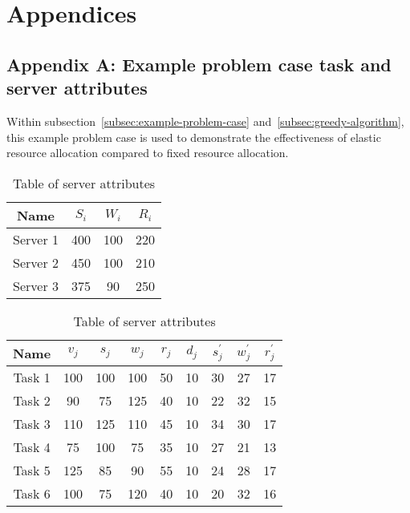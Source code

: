 \section*{Appendices}

\subsection*{Appendix A: Example problem case task and server attributes}
\label{app:example-problem-attributes}
Within subsection~\ref{subsec:example-problem-case} and~\ref{subsec:greedy-algorithm}, this example problem case is used
to demonstrate the effectiveness of elastic resource allocation compared to fixed resource allocation.
\begin{table}[h]
    \begin{minipage}{1.8in}
        \begin{tabular}{|c|c|c|c|}
            \hline
            Name     & $S_i$ & $W_i$ & $R_i$ \\ \hline
            Server 1 & 400   & 100   & 220   \\ \hline
            Server 2 & 450   & 100   & 210   \\ \hline
            Server 3 & 375   & 90    & 250   \\ \hline
        \end{tabular}
        \caption{Table of server attributes}
    \end{minipage}
    \begin{minipage}{3.5in}
        \begin{tabular}{|c|c|c|c|c|c|c|c|c|}
            \hline
            Name    & $v_j$ & $s_j$ & $w_j$ & $r_j$ & $d_j$ & $s^{'}_j$ & $w^{'}_j$ & $r^{'}_j$ \\ \hline
            Task 1  & 100   & 100   & 100   & 50    & 10    & 30        & 27        & 17        \\ \hline
            Task 2  & 90    & 75    & 125   & 40    & 10    & 22        & 32        & 15        \\ \hline
            Task 3  & 110   & 125   & 110   & 45    & 10    & 34        & 30        & 17        \\ \hline
            Task 4  & 75    & 100   & 75    & 35    & 10    & 27        & 21        & 13        \\ \hline
            Task 5  & 125   & 85    & 90    & 55    & 10    & 24        & 28        & 17        \\ \hline
            Task 6  & 100   & 75    & 120   & 40    & 10    & 20        & 32        & 16        \\ \hline

\end{tabular}
\end{minipage}
\end{table}
